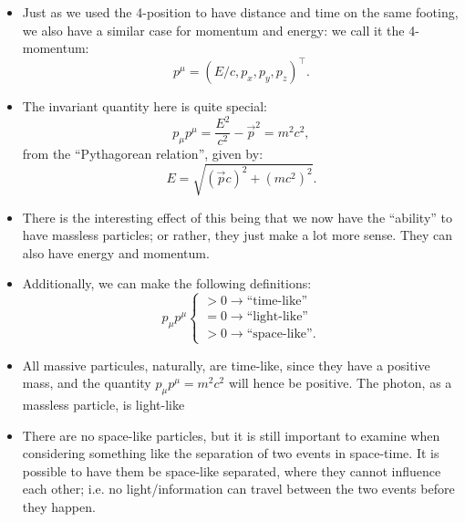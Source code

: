 \begin{itemize}
    \item Just as we used the 4-position to have distance and time on the same footing, we also have a similar case for momentum and energy: we call it the 4-momentum:
        \begin{equation}
            p^{\mu} = (E/c, p_x, p_y, p_z)^{\intercal}.
        \end{equation}
    \item The invariant quantity here is quite special:
        \begin{equation}
            p_{\mu}p^{\mu} = \frac{E^2}{c^2} - \vec{p}^2 = m^2c^2,
        \end{equation}
        from the ``Pythagorean relation'', given by:
        \begin{equation}
            E = \sqrt{(\vec{p}c)^2 + (mc^2)^2}.
        \end{equation}
    \item There is the interesting effect of this being that we now have the ``ability'' to have massless particles; or rather, they just make a lot more sense. They can also have energy and momentum.
    \item Additionally, we can make the following definitions:
        \begin{equation}
            p_{\mu}p^{\mu} 
            \begin{cases}
                >0 \rightarrow \text{``time-like''} \\
                =0 \rightarrow \text{``light-like''} \\
                >0 \rightarrow \text{``space-like''}.
            \end{cases}
        \end{equation}
    \item All massive particules, naturally, are time-like, since they have a positive mass, and the quantity $p_{\mu}p^{\mu} = m^2c^2$ will hence be positive. The photon, as a massless particle, is light-like 
    \item There are no space-like particles, but it is still important to examine when considering something like the separation of two events in space-time. It is possible to have them be space-like separated, where they cannot influence each other; i.e. no light/information can travel between the two events before they happen.
\end{itemize}



